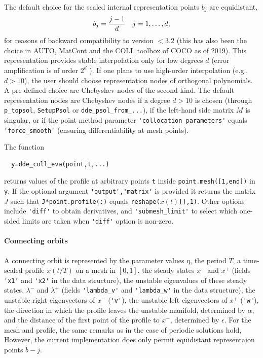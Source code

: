 \documentclass[10pt]{scrartcl}
\newcommand{\blist}[1]{\mbox{\lstinline!#1!}}
\begin{document}
The default choice for the scaled internal representation points $b_j$ are equidistant,
\begin{displaymath}
  b_j=\frac{j-1}{d}\mbox{\quad $j=1,\ldots,d$,}
\end{displaymath}
for reasons of backward compatibility to version $<3.2$ (this has also
been the choice in AUTO, MatCont and the COLL toolbox of \textsc{COCO}
as of 2019). This representation provides stable interpolation only
for low degrees $d$ (error amplification is of order $2^d$
\cite{berrut2004}). If one plans to use high-order interpolation
(e.g., $d>10$), the user should choose representation nodes of
orthogonal polynomials. A pre-defined choice are Chebyshev nodes of
the second kind. The default representation nodes are Chebyshev nodes
if a degree $d>10$ is chosen (through \blist{p_topsol},
\blist{SetupPsol} or \blist{dde_psol_from_...}), if the left-hand side
matrix $M$ is singular, or if the point method parameter
\blist{'collocation_parameters'} equals \blist{'force_smooth'}
(ensuring differentiability at mesh points).

The function
\begin{lstlisting}
  y=dde_coll_eva(point,t,...)
\end{lstlisting}
returns values of the profile at arbitrary points \blist{t} inside
\blist{point.mesh([1,end])} in \blist{y}. If the optional argument
\blist{'output','matrix'} is provided it returns the matrix $J$ such
that \blist{J*point.profile(:)} equals
\blist{reshape(}$x(t)$\blist{[],1)}. Other options include
\blist{'diff'} to obtain derivatives, and \blist{'submesh_limit'} to
select which one-sided limits are taken when \blist{'diff'} option is
non-zero.

\paragraph{Connecting orbits}
A connecting orbit is represented by the parameter values $\eta$, the
period $T$, a time-scaled profile $x(t/T)$ on a mesh in $[0,1]$, the
steady states $x^-$ and $x^+$ (fields \blist{'x1'} and \blist{'x2'} in
the data structure), the unstable eigenvalues of these steady states,
$\lambda^-$ and $\lambda^+$ (fields \blist{'lambda_v'} and
\blist{'lambda_w'} in the data structure), the unstable right
eigenvectors of $x^-$ (\blist{'v'}), the unstable left eigenvectors of
$x^+$ (\blist{'w'}), the direction in which the profile leaves the
unstable manifold, determined by $\alpha$, and the distance of the
first point of the profile to $x^-$, determined by $\epsilon$.  For
the mesh and profile, the same remarks as in the case of periodic
solutions hold, However, the current implementation does only permit
equidistant representaion points $b-j$.
\end{document}

